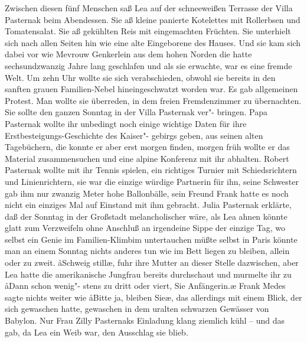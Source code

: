 Zwischen diesen fünf Menschen saß Lea auf der schneeweißen
Terrasse der Villa Pasternak beim Abendessen. Sie aß kleine
panierte Kotelettes mit Rollerbsen und Tomatensalat. Sie
aß gekühlten Reis mit eingemachten Früchten. Sie unterhielt
sich nach allen Seiten hin wie eine alte Eingeborene des
Hauses. Und sie kam sich dabei vor wie Mevrouw Genkerlein
aus dem hohen Norden\dopp{} die hatte sechsundzwanzig Jahre
lang geschlafen und als sie erwachte, war es eine fremde
Welt.
\abstand{}
Um zehn Uhr wollte sie sich verabschieden, obwohl sie bereits
in den sanften grauen Familien-Nebel hineingeschwatzt
worden war. Es gab allgemeinen Protest. Man wollte sie
überreden, in dem freien Fremdenzimmer zu übernachten.
Sie sollte den ganzen Sonntag in der Villa Pasternak ver"-%
bringen. Papa Pasternak wollte ihr unbedingt noch einige
wichtige Daten für ihre Erstbesteigungs-Geschichte des Kaiser"-%
gebirgs geben, aus seinen alten Tagebüchern, die konnte er
aber erst morgen finden, morgen früh wollte er das Material
zusammensuchen und eine alpine Konferenz mit ihr abhalten.
Robert Pasternak wollte mit ihr Tennis spielen, ein richtiges
Turnier mit Schiedsrichtern und Linienrichtern, sie war die
einzige würdige Partnerin für ihn, seine Schwester gab
ihm nur zwanzig Meter hohe Ballonbälle, sein Freund Frank
hatte es noch nicht ein einziges Mal auf Einstand mit ihm
gebracht. Julia Pasternak erklärte, daß der Sonntag in der
Großstadt melancholischer wäre, als Lea ahnen könnte\semi{}
glatt zum Verzweifeln ohne Anschluß an irgendeine Sippe\semi{}
der einzige Tag, wo selbst ein Genie im Familien-Klimbim
untertauchen müßte\semi{} selbst in Paris könnte man an einem
Sonntag nichts anderes tun wie im Bett liegen zu bleiben,
allein oder zu zweit. \aa{}Schweig still\ae{}, fuhr ihre Mutter an dieser
Stelle dazwischen, aber Lea hatte die amerikanische Jungfrau
bereits durchschaut und murmelte ihr zu\dopp{} \aa{}Dann schon wenig"-%
stens zu dritt oder viert, Sie Anfängerin.\ae{} Frank Medes sagte
nichts weiter wie\dopp{} \aa{}Bitte ja, bleiben Sie\ausr{}\ae{}, das allerdings
mit einem Blick, der sich gewaschen hatte, gewaschen in dem
uralten schwarzen Gewässer von Babylon. Nur Frau Zilly
Pasternaks Einladung klang ziemlich kühl -- und das gab, da
Lea ein Weib war, den Ausschlag\dopp{} sie blieb.

